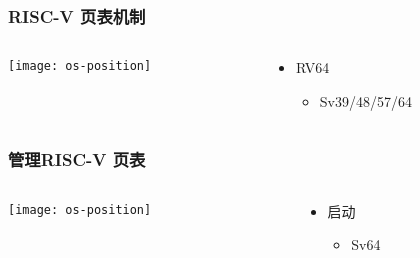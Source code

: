 \begin{frame} 
	\frametitle{RISC-V 页表机制}
	
	\begin{columns}
		
		\begin{column}{.5\textwidth}
			
			\texttt{[image: os-position]}
			
		\end{column}
		
		
		\begin{column}{.5\textwidth}
			
			\begin{itemize}\Large
				\item RV64
				\begin{itemize}\large
					\item Sv39/48/57/64
					
				\end{itemize}
			\end{itemize}
			
		\end{column}
		
		
	\end{columns}
\end{frame}



\begin{frame} 
	\frametitle{管理RISC-V 页表}
	
	\begin{columns}
		
		\begin{column}{.5\textwidth}
			
			\texttt{[image: os-position]}
			
		\end{column}
		
		
		\begin{column}{.5\textwidth}
			
			\begin{itemize}\Large
				\item 启动
				\begin{itemize}\large
					\item Sv64
					
				\end{itemize}
			\end{itemize}
			
		\end{column}
		
		
	\end{columns}
\end{frame}



